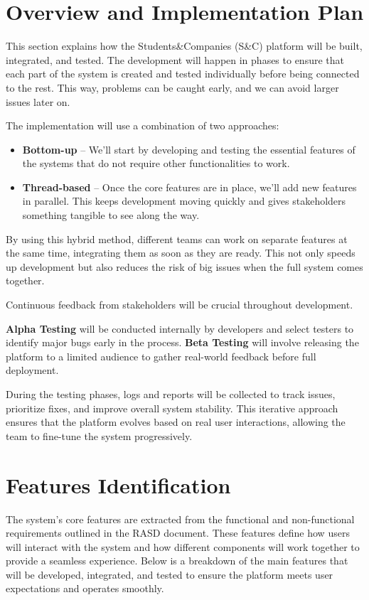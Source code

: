 \section{Overview and Implementation Plan}
This section explains how the Students\&Companies (S\&C) platform will be built, integrated, and tested. The development will happen in phases to ensure that each part of the system is created and tested individually before being connected to the rest. This way, problems can be caught early, and we can avoid larger issues later on.

The implementation will use a combination of two approaches:
\begin{itemize}
    \item  \textbf{Bottom-up} – We’ll start by developing and testing the essential features of the systems that do not require other functionalities to work.
    \item \textbf{Thread-based} – Once the core features are in place, we’ll add new features in parallel. This keeps development moving quickly and gives stakeholders something tangible to see along the way.
\end{itemize}

By using this hybrid method, different teams can work on separate features at the same time, integrating them as soon as they are ready. This not only speeds up development but also reduces the risk of big issues when the full system comes together.

Continuous feedback from stakeholders will be crucial throughout development.

\textbf{Alpha Testing} will be conducted internally by developers and select testers to identify major bugs early in the process. \textbf{Beta Testing} will involve releasing the platform to a limited audience to gather real-world feedback before full deployment.

During the testing phases, logs and reports will be collected to track issues, prioritize fixes, and improve overall system stability. This iterative approach ensures that the platform evolves based on real user interactions, allowing the team to fine-tune the system progressively.

\section{Features Identification}
The system's core features are extracted from the functional and non-functional requirements outlined in the RASD document. These features define how users will interact with the system and how different components will work together to provide a seamless experience. Below is a breakdown of the main features that will be developed, integrated, and tested to ensure the platform meets user expectations and operates smoothly.

